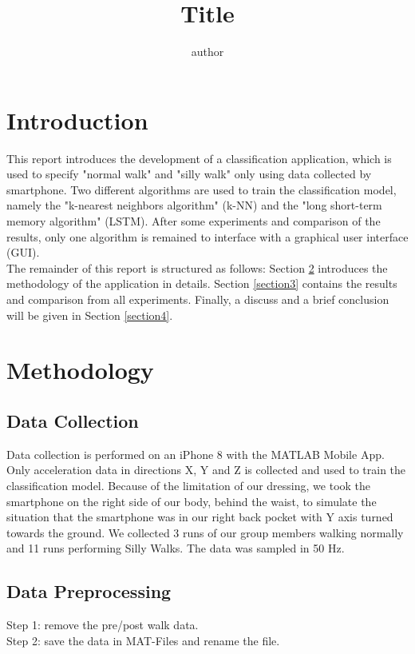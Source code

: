 \documentclass{article}
\title{Title}
\author{author}
\begin{document}
\maketitle



\section{Introduction}\label{section1}
This report introduces the development of a classification application, which is used to specify "normal walk" and "silly walk" only using data collected by smartphone. Two different algorithms are used to train the classification model, namely the "k-nearest neighbors algorithm" (k-NN) and the "long short-term memory algorithm" (LSTM). After some experiments and comparison of the results, only one algorithm is remained to interface with a graphical user interface (GUI).\\
The remainder of this report is structured as follows: Section \ref{section2} introduces the methodology of the application in details. Section \ref{section3} contains the results and comparison from all experiments. Finally, a discuss and a brief conclusion will be given in Section \ref{section4}.
\section{Methodology}\label{section2}

\subsection{Data Collection}\label{section2.1}
Data collection is performed on an iPhone 8 with the MATLAB Mobile App. Only acceleration data in directions X, Y and Z is collected and used to train the classification model. Because of the limitation of our dressing, we took the smartphone on the right side of our body, behind the waist, to simulate the situation that the smartphone was in our right back pocket with Y axis turned towards the ground.
We collected 3 runs of our group members walking normally and 11 runs performing Silly Walks. The data was sampled in 50 Hz.


\subsection{Data Preprocessing}\label{section2.2}
Step 1: remove the pre/post walk data.\\
Step 2: save the data in MAT-Files and rename the file.
\end{document}

